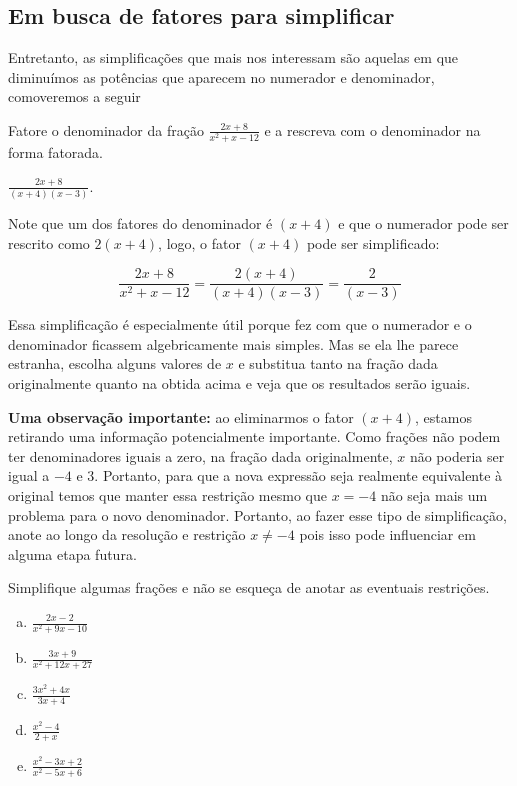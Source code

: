 \documentclass[main.tex]{subfiles}
\begin{document}
\subsection*{Em busca de fatores para simplificar}

Entretanto, as simplificações que mais nos interessam são aquelas em que diminuímos as potências que aparecem no numerador e denominador, comoveremos a seguir 

\begin{questao}
Fatore o denominador da fração $\frac{2x+8}{x^2+x-12}$ e a rescreva com o denominador na forma fatorada. 
\end{questao}

\begin{gabarito}
	\begin{gabaritoQuestao}
		$\frac{2x+8}{(x+4)(x-3)}$.
	\end{gabaritoQuestao}
\end{gabarito}

Note que um dos fatores do denominador é $(x+4)$ e que o numerador pode ser rescrito como $2(x+4)$, logo, o fator $(x+4)$ pode ser simplificado:

$$\frac{2x+8}{x^2+x-12} = \frac{2(x+4)}{(x+4)(x-3)} = \frac{2}{(x-3)}$$

Essa simplificação é especialmente útil porque fez com que o numerador e o denominador ficassem algebricamente mais simples. Mas se ela lhe parece estranha, escolha alguns valores de $x$ e substitua tanto na fração dada originalmente quanto na obtida acima e veja que os resultados serão iguais.

\textbf{Uma observação importante:} ao eliminarmos o fator $(x+4)$, estamos retirando uma informação potencialmente importante. Como frações não podem ter denominadores iguais a zero, na fração dada originalmente, $x$ não poderia ser igual a $-4$ e $3$. Portanto, para que a nova expressão seja realmente equivalente à original temos que manter essa restrição mesmo que $x=-4$ não seja mais um problema para o novo denominador. Portanto, ao fazer esse tipo de simplificação, anote ao longo da resolução e restrição $x \neq -4$ pois isso pode influenciar em alguma etapa futura.

\begin{questao}
Simplifique algumas frações e não se esqueça de anotar as eventuais restrições.
\begin{enumerate}[a)]
\item $\frac{2x-2}{x^2+9x-10}$
\item $\frac{3x+9}{x^2+12x+27}$
\item $\frac{3x^2+4x}{3x+4}$
\item $\frac{x^2-4}{2+x}$
\item $\frac{x^2-3x+2}{x^2-5x+6}$
\end{enumerate}
\end{questao}
\end{document}
